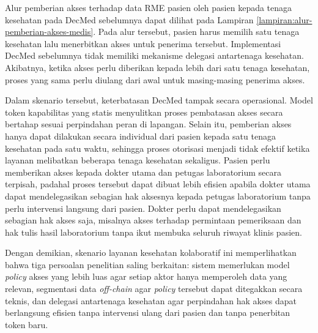 Alur pemberian akses terhadap data RME pasien oleh pasien kepada tenaga kesehatan pada DecMed sebelumnya dapat dilihat pada Lampiran \ref{lampiran:alur-pemberian-akses-medis}. Pada alur tersebut, pasien harus memilih satu tenaga kesehatan lalu menerbitkan akses untuk penerima tersebut. Implementasi DecMed sebelumnya tidak memiliki mekanisme delegasi antartenaga kesehatan. Akibatnya, ketika akses perlu diberikan kepada lebih dari satu tenaga kesehatan, proses yang sama perlu diulang dari awal untuk masing-masing penerima akses.

Dalam skenario tersebut, keterbatasan DecMed tampak secara operasional. Model token kapabilitas yang statis menyulitkan proses pembatasan akses secara bertahap sesuai perpindahan peran di lapangan. Selain itu, pemberian akses hanya dapat dilakukan secara individual dari pasien kepada satu tenaga kesehatan pada satu waktu, sehingga proses otorisasi menjadi tidak efektif ketika layanan melibatkan beberapa tenaga kesehatan sekaligus. Pasien perlu memberikan akses kepada dokter utama dan petugas laboratorium secara terpisah, padahal proses tersebut dapat dibuat lebih efisien apabila dokter utama dapat mendelegasikan sebagian hak aksesnya kepada petugas laboratorium tanpa perlu intervensi langsung dari pasien. Dokter perlu dapat mendelegasikan sebagian hak akses saja, misalnya akses terhadap permintaan pemeriksaan dan hak tulis hasil laboratorium tanpa ikut membuka seluruh riwayat klinis pasien.

Dengan demikian, skenario layanan kesehatan kolaboratif ini memperlihatkan bahwa tiga persoalan penelitian saling berkaitan: sistem memerlukan model \textit{policy} akses yang lebih luas agar setiap aktor hanya memperoleh data yang relevan, segmentasi data \textit{off-chain} agar \textit{policy} tersebut dapat ditegakkan secara teknis, dan delegasi antartenaga kesehatan agar perpindahan hak akses dapat berlangsung efisien tanpa intervensi ulang dari pasien dan tanpa penerbitan token baru.
